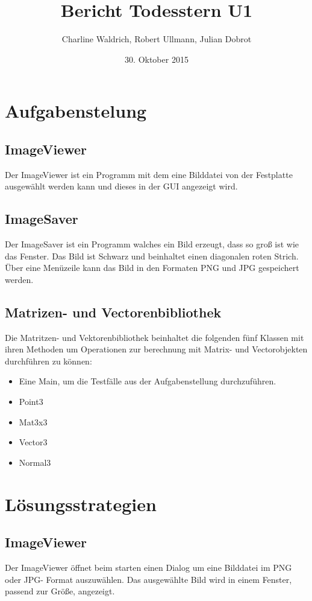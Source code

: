 \documentclass[14pt]{extarticle}
\title{Bericht Todesstern U1}
\author{Charline Waldrich, Robert Ullmann, Julian Dobrot}
\date{30. Oktober 2015}
\begin{document}
\maketitle
\tableofcontents
\pagebreak

\section{Aufgabenstelung}

\subsection{ImageViewer}
Der ImageViewer ist ein Programm mit dem eine Bilddatei von der Festplatte ausgewählt werden kann und dieses in der GUI angezeigt wird. 
\subsection{ImageSaver}
Der ImageSaver ist ein Programm walches ein Bild erzeugt, dass so groß ist wie das Fenster.
Das Bild ist Schwarz und beinhaltet einen diagonalen roten Strich. Über eine Menüzeile kann das Bild in den Formaten PNG und JPG gespeichert werden.
\subsection{Matrizen- und Vectorenbibliothek}
Die Matritzen- und Vektorenbibliothek beinhaltet die folgenden fünf Klassen mit ihren Methoden um Operationen 
zur berechnung mit Matrix- und Vectorobjekten durchführen zu können:

\begin{itemize}
\item Eine Main, um die Testfälle aus der Aufgabenstellung durchzuführen.
\item Point3
\item Mat3x3
\item Vector3 
\item Normal3
\end{itemize}


\section{Lösungsstrategien}
\subsection{ImageViewer}
Der ImageViewer öffnet beim starten einen Dialog um eine Bilddatei im PNG oder JPG- Format auszuwählen. Das ausgewählte Bild wird in einem Fenster, passend zur Größe, angezeigt.
\end{document}
